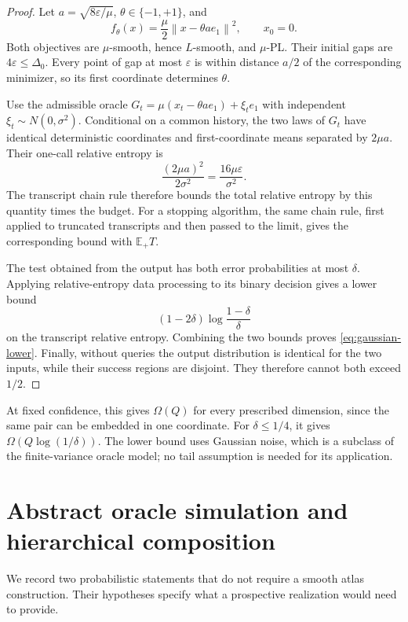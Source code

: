 \documentclass[11pt,a4paper]{article}
\newcommand{\E}{\mathbb E}
\newcommand{\eps}{\varepsilon}
\newcommand{\norm}[1]{\left\lVert #1\right\rVert}
\theoremstyle{definition}
\theoremstyle{remark}
\begin{document}
\begin{proof}
Let $a=\sqrt{8\eps/\mu}$, $\theta\in\{-1,+1\}$, and
\[
 f_\theta(x)=\frac\mu2\norm{x-\theta a e_1}^2,\qquad x_0=0.
\]
Both objectives are $\mu$-smooth, hence $L$-smooth, and
$\mu$-PL.  Their initial gaps are $4\eps\le\Delta_0$.
Every point of gap at most $\eps$ is within distance $a/2$
of the corresponding minimizer, so its first coordinate
determines $\theta$.

Use the admissible oracle
$G_t=\mu(x_t-\theta a e_1)+\xi_t e_1$ with independent
$\xi_t\sim N(0,\sigma^2)$.  Conditional on a common history,
the two laws of $G_t$ have identical deterministic coordinates
and first-coordinate means separated by $2\mu a$.
Their one-call relative entropy is
\[
 \frac{(2\mu a)^2}{2\sigma^2}
 =\frac{16\mu\eps}{\sigma^2}.
\]
The transcript chain rule therefore bounds the total relative
entropy by this quantity times the budget.
For a stopping algorithm, the same chain rule, first applied
to truncated transcripts and then passed to the limit, gives
the corresponding bound with $\E_{+}T$.

The test obtained from the output has both error probabilities
at most $\delta$.  Applying relative-entropy data processing
to its binary decision gives a lower bound
\[
 (1-2\delta)\log\frac{1-\delta}{\delta}
\]
on the transcript relative entropy.  Combining the two bounds
proves \eqref{eq:gaussian-lower}.
Finally, without queries the output distribution is identical
for the two inputs, while their success regions are disjoint.
They therefore cannot both exceed $1/2$.
\end{proof}

At fixed confidence, this gives $\Omega(Q)$ for every prescribed
dimension, since the same pair can be embedded in one coordinate.
For $\delta\le1/4$, it gives
$\Omega(Q\log(1/\delta))$.  The lower bound uses Gaussian noise,
which is a subclass of the finite-variance oracle model;
no tail assumption is needed for its application.



\section{Abstract oracle simulation and hierarchical composition}
\label{app:probability}

We record two probabilistic statements that do not require a smooth atlas
construction.  Their hypotheses specify what a prospective realization
would need to provide.
\end{document}
